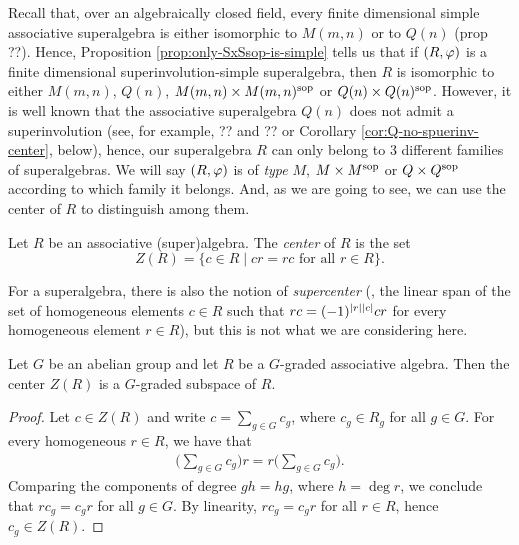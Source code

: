 Recall that, over an algebraically closed field, every finite dimensional simple associative superalgebra is either isomorphic to $M(m,n)$ or to $Q(n)$ (prop ??). 
Hence, Proposition \ref{prop:only-SxSsop-is-simple} tells us that if $(R, \varphi)$ is a  finite dimensional superinvolution-simple superalgebra, then $R$ is isomorphic to either $M(m,n)$, $Q(n)$, $M(m,n) \times M(m,n)^{\mathrm{sop}}$ or $Q(n) \times Q(n)^{\mathrm{sop}}$.
However, it is well known that the associative superalgebra $Q(n)$ does not admit a superinvolution (see, for example, ?? and ?? or Corollary \ref{cor:Q-no-spuerinv-center}, below),
hence, our superalgebra $R$ can only belong to 3 different families of superalgebras. 
We will say $(R,\varphi)$ is of \emph{type} $M$, $M\times M^{\mathrm{sop}}$ or $Q\times Q^{\mathrm{sop}}$ according to which family it belongs. 
And, as we are going to see, we can use the center of $R$ to distinguish among them.

\begin{defi}
    Let $R$ be an associative (super)algebra.
    The \emph{center} of $R$ is the set 
    \[
        Z(R) = \{c\in R \mid cr = rc \text{ for all } r\in R \}.
    \]
\end{defi}

\begin{remark}
    For a superalgebra, there is also the notion of \emph{supercenter} (\ie, the linear span of the set of homogeneous elements $c \in R$ such that $rc = (-1)^{|r||c|} cr$ for every homogeneous element $r \in R$), but this is not what we are considering here.
\end{remark}



\begin{lemma}\label{lemma:center-is-graded}
    Let $G$ be an abelian group and let $R$ be a $G$-graded associative algebra.
    Then the center $Z(R)$ is a $G$-graded subspace of $R$. 
\end{lemma}

\begin{proof}
    Let $c \in Z(R)$ and write $c = \sum_{g\in G} c_g$, where $c_g \in R_g$ for all $g \in G$.
    For every homogeneous $r \in R$, we have that
    \begin{align*}
        \big(\sum_{g\in G} c_g\big)r = r \big(\sum_{g\in G} c_g\big).
    \end{align*}
    Comparing the components of degree $gh = hg$, where $h = \deg r$, we conclude that $rc_g = c_g r$ for all $g \in G$. 
    By linearity, $r c_g = c_g r$ for all $r\in R$, hence $c_g \in Z(R)$.
\end{proof}

